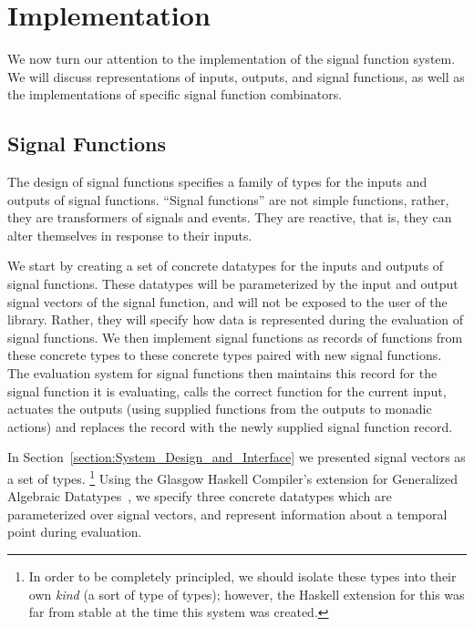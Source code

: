 \section{Implementation}
\label{section:Implementation}

We now turn our attention to the implementation of the signal function
system. We will discuss representations of inputs, outputs, and signal functions,
as well as the implementations of specific signal function combinators.

\subsection{Signal Functions}
\label{subsection:Implementation-Signal_Functions}

The design of signal functions specifies a family of types for the inputs and
outputs of signal functions. ``Signal functions'' are not simple functions,
rather, they are transformers of signals and events. They are reactive, that is,
they can alter themselves in response to their inputs. 

We start by creating a set of concrete datatypes for the inputs and outputs of
signal functions. These datatypes will be parameterized by the input and output
signal vectors of the signal function, and will not be exposed to the user of
the library. Rather, they will specify how data is represented during the
evaluation of signal functions. We then implement signal functions
as records of functions from these concrete types to these concrete types paired
with new signal functions. The evaluation system for signal functions then
maintains this record for the signal function it is evaluating, calls the
correct function for the current input, actuates the outputs (using supplied
functions from the outputs to monadic actions) and replaces the record with the
newly supplied signal function record.

In Section~\ref{section:System_Design_and_Interface} we presented signal vectors
as a set of types. \footnote{In order to be completely principled, we should
isolate these types into their own {\em kind} (a sort of type of types);
however, the Haskell extension for this was far from stable at the time this
system was created.} Using the Glasgow Haskell Compiler's extension for
Generalized Algebraic Datatypes~\cite{Cheney2003,Xi2003,PeytonJones2006}, we
specify three concrete datatypes which are parameterized over signal vectors,
and represent information about a temporal point during evaluation.

